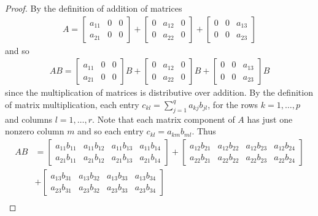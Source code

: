 \documentclass[12pt]{article}
\begin{document}
    \begin{proof}
      By the definition of addition of matrices
    \begin{align*}
      A = \begin{bmatrix} a_{11} & 0 & 0\\ a_{21} & 0 & 0 \end{bmatrix}  +
       \begin{bmatrix} 0 & a_{12} & 0 \\ 0 & a_{22} & 0  \end{bmatrix}  +
       \begin{bmatrix} 0 & 0 & a_{13} \\ 0 & 0 & a_{23}\end{bmatrix}  
    \end{align*}
    and so
    \begin{align*}
      AB = \begin{bmatrix} a_{11} & 0 & 0\\ a_{21} & 0 & 0 \end{bmatrix} B +
       \begin{bmatrix} 0 & a_{12} & 0 \\ 0 & a_{22} & 0  \end{bmatrix} B +
       \begin{bmatrix} 0 & 0 & a_{13} \\ 0 & 0 & a_{23}\end{bmatrix} B 
    \end{align*}
    since the multiplication of matrices is distributive over addition. By the definition of matrix multiplication, each entry $c_{kl} = \sum_{j=1}^{q} a_{kj}b_{jl}$, for the rows $k  = 1,\dots,p$ and columns $l= 1,\dots,r$. Note that each matrix component of $A$ has just one nonzero column $m$ and so each entry $c_{kl} = a_{km}b_{ml}$. Thus 
    \begin{align*}
      AB &= \begin{bmatrix} a_{11}b_{11} & a_{11}b_{12} & a_{11}b_{13} & a_{11}b_{14}\\ a_{21}b_{11} & a_{21}b_{12} & a_{21}b_{13} & a_{21}b_{14} \end{bmatrix}  + \begin{bmatrix} a_{12}b_{21} & a_{12}b_{22} & a_{12}b_{23} & a_{12}b_{24}\\ a_{22}b_{21} & a_{22}b_{22} & a_{22}b_{23} & a_{22}b_{24} \end{bmatrix}  \\
      &+ \begin{bmatrix} a_{13}b_{31} & a_{13}b_{32} & a_{13}b_{33} & a_{13}b_{34}\\ a_{23}b_{31} & a_{23}b_{32} & a_{23}b_{33} & a_{23}b_{34} \end{bmatrix}\\

\end{align*}
\end{proof}
\end{document}

